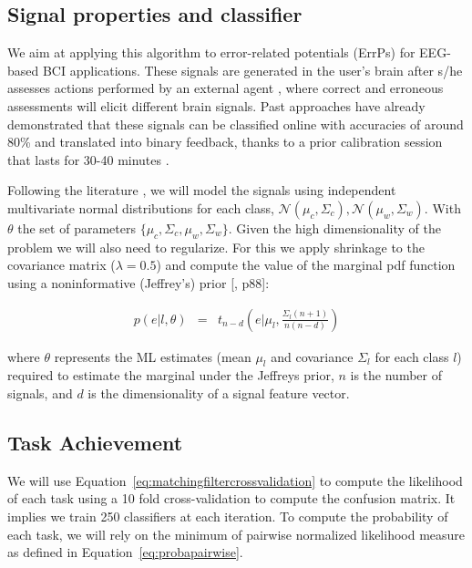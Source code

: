 \subsection{Signal properties and classifier}

We aim at applying this algorithm to error-related potentials (ErrPs) for EEG-based BCI applications. These signals are generated in the user's brain after s/he assesses actions performed by an external agent \cite{chavarriaga2010learning}, where correct and erroneous assessments will elicit different brain signals. Past approaches have already demonstrated that these signals can be classified online with accuracies of around 80\% and translated into binary feedback, thanks to a prior calibration session that lasts for 30-40 minutes \cite{chavarriaga2010learning, iturrate2013task}.

Following the literature \cite{blankertz2010single}, we will model the signals using independent multivariate normal distributions for each class, $\mathcal{N}(\mu_c, \Sigma_c), \mathcal{N}(\mu_w, \Sigma_w)$. With $\theta$ the set of parameters $\{\mu_c, \Sigma_c,\mu_w, \Sigma_w\}$. Given the high dimensionality of the problem we will also need to regularize. For this we apply shrinkage to the covariance matrix ($\lambda = 0.5$) and compute the value of the marginal pdf function using a noninformative (Jeffrey's) prior [\cite{gelman2003bayesian}, p88]:

\begin{eqnarray}
p(e|l, \theta) & = & t_{n-d}(e | \mu_l,\frac{\Sigma_l (n+1)}{n(n-d)})
\label{eq:prior}
\end{eqnarray}

where $\theta$ represents the ML estimates (mean $\mu_l$ and covariance $\Sigma_l$ for each class $l$) required to estimate the marginal under the Jeffreys prior, $n$ is the number of signals, and $d$ is the dimensionality of a signal feature vector.

\subsection{Task Achievement}

We will use Equation~\ref{eq:matchingfiltercrossvalidation} to compute the likelihood of each task using a 10 fold cross-validation to compute the confusion matrix. It implies we train 250 classifiers at each iteration. To compute the probability of each task, we will rely on the minimum of pairwise normalized likelihood measure as defined in Equation~\ref{eq:probapairwise}.

